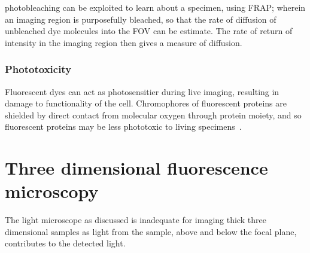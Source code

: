 
\Gls{photobleaching} can be exploited to learn about a specimen, using \gls{FRAP}; wherein an imaging region is purposefully bleached, so that the rate of diffusion of unbleached dye molecules into the \gls{FOV} can be estimate.
The rate of return of intensity in the imaging region then gives a measure of diffusion.


\subsubsection{Phototoxicity}

Fluorescent dyes can act as \gls{photosensitier} during live imaging, resulting in damage to functionality of the cell.
Chromophores of fluorescent proteins are shielded by direct contact from molecular oxygen through protein moiety, and so fluorescent proteins may be less phototoxic to living specimens~\cite{pawleyHandbookBiologicalConfocal2006}.


\section{Three dimensional fluorescence microscopy}

The light microscope as discussed is inadequate for imaging thick three dimensional samples as light from the sample, above and below the focal plane, contributes to the detected light.

